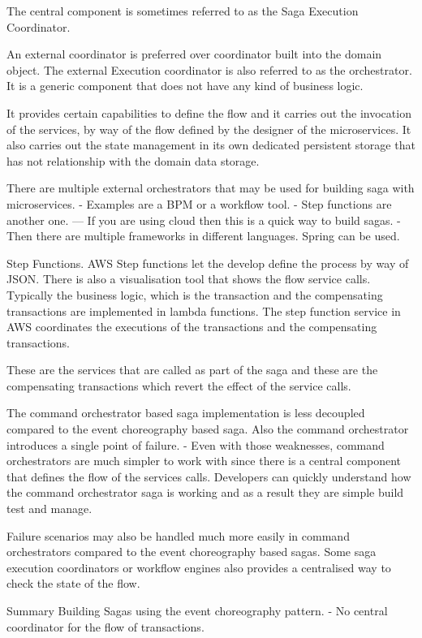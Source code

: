 The central component is sometimes referred to as the Saga Execution Coordinator.

An external coordinator is preferred over coordinator built into the domain object.
The external Execution coordinator is also referred to as the orchestrator.
It is a generic component that does not have any kind of business logic.

It provides certain capabilities to define the flow and it carries out the invocation of the services, by way of the flow defined by the designer of the microservices.
It also carries out the state management in its own dedicated persistent storage that has not relationship with the domain data storage.

There are multiple external orchestrators that may be used for building saga with microservices.
- Examples are a BPM or a workflow tool.
- Step functions are another one.
--- If you are using cloud then this is a quick way to build sagas.
- Then there are multiple frameworks in different languages. Spring can be used.

Step Functions.
AWS Step functions let the develop define the process by way of JSON.
There is also a visualisation tool that shows the flow service calls.
Typically the business logic, which is the transaction and the compensating transactions are implemented in lambda functions.
The step function service in AWS coordinates the executions of the transactions and the compensating transactions.

These are the services that are called as part of the saga and these are the compensating transactions which revert the effect of the service calls.

The command orchestrator based saga implementation is less decoupled compared to the event choreography based saga.
Also the command orchestrator introduces a single point of failure.
- Even with those weaknesses, command orchestrators are much simpler to work with since there is a central component that defines the flow of the services calls.
Developers can quickly understand how the command orchestrator saga is working and as a result they are simple build test and manage.

Failure scenarios may also be handled much more easily in command orchestrators compared to the event choreography based sagas.
Some saga execution coordinators or workflow engines also provides a centralised way to check the state of the flow.

Summary
Building Sagas using the event choreography pattern.
- No central coordinator for the flow of transactions.

